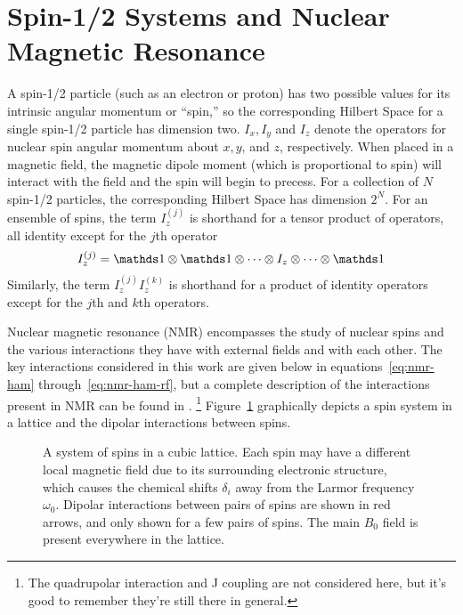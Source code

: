 \section{Spin-1/2 Systems and Nuclear Magnetic Resonance}

A spin-1/2 particle (such as an electron or proton) has two possible values for its intrinsic angular momentum or ``spin,'' so the corresponding Hilbert Space for a single spin-1/2 particle has dimension two. $I_x, I_y$ and $I_z$ denote the operators for nuclear spin angular momentum about $x, y$, and $z$, respectively. When placed in a magnetic field, the magnetic dipole moment (which is proportional to spin) will interact with the field and the spin will begin to precess.
For a collection of $N$ spin-1/2 particles, the corresponding Hilbert Space has dimension $2^N$.
For an ensemble of spins, the term $I_z^{(j)}$ is shorthand for a tensor product of operators, all identity except for the $j$th operator
\[
I_z^{(j)} = \identity \otimes \identity \otimes \dots \otimes I_z \otimes \dots \otimes \identity
\]
Similarly, the term $I_z^{(j)}I_z^{(k)}$ is shorthand for a product of identity operators except for the $j$th and $k$th operators.

Nuclear magnetic resonance (NMR) encompasses the study of nuclear spins and the various interactions they have with external fields and with each other.
The key interactions considered in this work are given below in equations~\ref{eq:nmr-ham} through~\ref{eq:nmr-ham-rf}, but a complete description of the interactions present in NMR can be found in \cite{1976ii}.%
\footnote{The quadrupolar interaction and J coupling are not considered here, but it's good to remember they're still there in general.}
Figure~\ref{fig:spin-system} graphically depicts a spin system in a lattice and the dipolar interactions between spins.

\begin{figure}[H]
    \centering
    
    \caption{A system of spins in a cubic lattice. Each spin may have a different local magnetic field due to its surrounding electronic structure, which causes the chemical shifts $\delta_i$ away from the Larmor frequency $\omega_0$. Dipolar interactions between pairs of spins are shown in red arrows, and only shown for a few pairs of spins. The main $B_0$ field is present everywhere in the lattice.}
    \label{fig:spin-system}
\end{figure}

